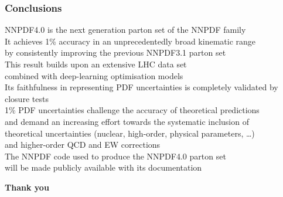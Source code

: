 \documentclass{beamer}
\begin{document}
\begin{frame}
 \frametitle{Conclusions}
 \footnotesize
 \centering
 NNPDF4.0 is the next generation parton set of the NNPDF family\\
 \vspace{0.3cm}
 It achieves 1\% accuracy in an unprecedentedly broad kinematic range\\
 by consistently improving the previous NNPDF3.1 parton set\\
 \vspace{0.3cm}
 This result builds upon an extensive LHC data set\\ 
 combined with deep-learning optimisation models\\
 \vspace{0.3cm}
 Its faithfulness in representing PDF uncertainties is completely validated by closure tests\\
 \vspace{0.3cm}
 1\% PDF uncertainties challenge the accuracy of theoretical predictions\\
 and demand an increasing effort towards the systematic inclusion of\\ 
 theoretical uncertainties (nuclear, high-order, physical parameters, \dots)\\
 and higher-order QCD and EW corrections\\
 \vspace{0.3cm}
 The NNPDF code used to produce the NNPDF4.0 parton set\\ 
 will be made publicly available with its documentation\\
 \vspace{1cm}
 \begin{overlayarea}{\textwidth}{0.5cm}
  {
  }
  {
  \centering
  \Large\bf Thank you
  }
 \end{overlayarea}
\end{frame}
\end{document}
